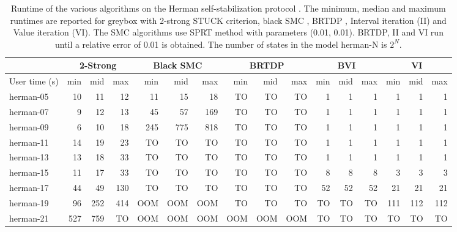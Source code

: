 \begin{table}[]
\centering
\caption{Runtime of the various algorithms on the Herman self-stabilization protocol \cite{herman}. The minimum, median and maximum runtimes are reported for greybox with 2-strong STUCK criterion, black SMC \cite{fsmc}, BRTDP \cite{brtdp}, Interval iteration (II) and Value iteration (VI). The SMC algorithms use SPRT method with parameters (0.01, 0.01). BRTDP, II and VI run until  a relative error of 0.01 is obtained. The number of states in the model herman-N is $2^N$. }
\label{tab:herman}
\begin{tabular}{l@{\hskip 1.5em}rrr@{\hskip 1.5em}rrr@{\hskip 1.5em}rrr@{\hskip 1.5em}rrr@{\hskip 1.5em}rrr@{}}
	\toprule
	\textit{}     & \multicolumn{3}{c}{2-Strong} & \multicolumn{3}{c}{Black SMC} & \multicolumn{3}{c}{BRTDP} & \multicolumn{3}{c}{BVI} & \multicolumn{3}{c}{VI} \\ \midrule
	User time (s) & min & mid &              max & min & mid &          max & min & mid &           max & min & mid &         max & min & mid &        max \\
	herman-05      &  10 &  11 &               12 &  11 &  15 &           18 &  TO &  TO &            TO &   1 &   1 &           1 &   1 &   1 &          1 \\
	herman-07      &   9 &  12 &               13 &  45 &  57 &          169 &  TO &  TO &            TO &   1 &   1 &           1 &   1 &   1 &          1 \\
	herman-09      &   6 &  10 &               18 & 245 & 775 &          818 &  TO &  TO &            TO &   1 &   1 &           1 &   1 &   1 &          1 \\
	herman-11      &  14 &  19 &               23 &  TO &  TO &           TO &  TO &  TO &            TO &   1 &   1 &           1 &   1 &   1 &          1 \\
	herman-13      &  13 &  18 &               33 &  TO &  TO &           TO &  TO &  TO &            TO &   1 &   1 &           1 &   1 &   1 &          1 \\
	herman-15      &  11 &  17 &               33 &  TO &  TO &           TO &  TO &  TO &            TO &   8 &   8 &           8 &   3 &   3 &          3 \\
	herman-17      &  44 &  49 &              130 &  TO &  TO &           TO &  TO &  TO &            TO &  52 &  52 &          52 &  21 &  21 &         21 \\
	herman-19      &  96 & 252 &              414 &  OOM &  OOM &           OOM &  TO &  TO &            TO &  TO &  TO &          TO & 111 & 112 &        112 \\
	herman-21      & 527 & 759 &               TO &  OOM &  OOM &           OOM &  OOM &  OOM &            OOM &  TO &  TO &          TO &  TO &  TO &         TO \\ \bottomrule
\end{tabular}
\end{table}
